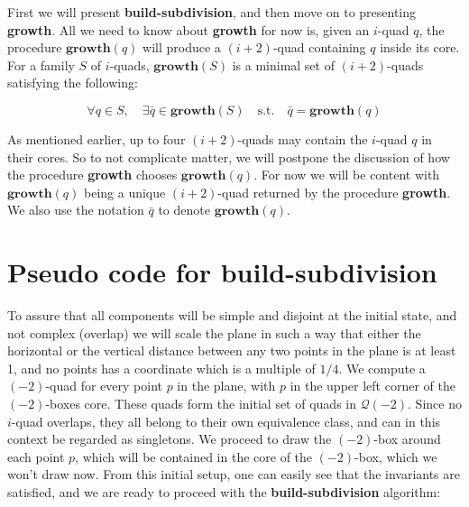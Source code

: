First we will present \textbf{build-subdivision}, and then move on to presenting \textbf{growth}. 
All we need to know about \textbf{growth} for now is, given an $i$-quad $q$, the procedure 
$\mathbf{growth}(q)$ will produce a $(i+2)$-quad containing $q$ inside its core. For a family 
$S$ of $i$-quads, $\mathbf{growth}(S)$ is a minimal set of $(i+2)$-quads satisfying the following:

$$\forall q \in S, \quad \exists \bar{q} \in \mathbf{growth}(S) \quad \text{s.t.} \quad \bar{q} 
= \mathbf{growth}(q)$$

As mentioned earlier, up to four $(i+2)$-quads may contain the $i$-quad $q$ in their cores. So 
to not complicate matter, we will postpone the discussion of how the procedure \textbf{growth} 
chooses $\mathbf{growth}(q)$. For now we will be content with $\mathbf{growth}(q)$ being a 
unique $(i+2)$-quad returned by the procedure \textbf{growth}. We also use the notation $\bar{q}$ 
to denote $\mathbf{growth}(q)$.

\section{Pseudo code for \textbf{build-subdivision}}

To assure that all components will be simple and disjoint at the initial state, and not complex 
(overlap) we will scale the plane in such a way that either the horizontal or the vertical 
distance between any two points in the plane is at least 1, and no points has a coordinate which 
is a multiple of $1/4$. We compute a $(-2)$-quad for every point $p$ in the plane, with $p$ in 
the upper left corner of the $(-2)$-boxes core. These quads form the initial set of quads in 
$\mathcal{Q}(-2)$. Since no $i$-quad overlaps, they all belong to their own equivalence class, 
and can in this context be regarded as singletons. We proceed to draw the $(-2)$-box around 
each point $p$, which will be contained in the core of the $(-2)$-box, which we won't draw now. 
From this initial setup, one can easily see that the invariants are satisfied, and we are ready 
to proceed with the \textbf{build-subdivision} algorithm:

